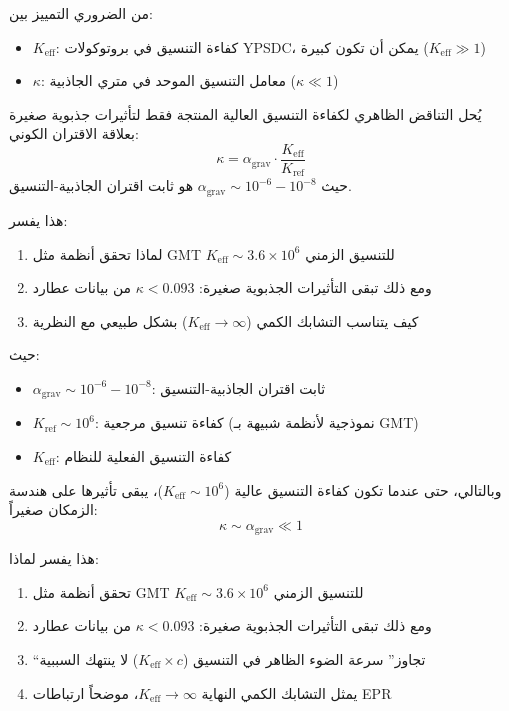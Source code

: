 \documentclass[11pt,a4paper]{article}
\begin{document}
	من الضروري التمييز بين:
	\begin{itemize}
		\item \textbf{$K_{\mathrm{eff}}$}: كفاءة التنسيق في بروتوكولات YPSDC، يمكن أن تكون كبيرة ($K_{\mathrm{eff}} \gg 1$)
		\item \textbf{$\kappa$}: معامل التنسيق الموحد في متري الجاذبية ($\kappa \ll 1$)
	\end{itemize}
	
	يُحل التناقض الظاهري لكفاءة التنسيق العالية المنتجة فقط لتأثيرات جذبوية صغيرة بعلاقة الاقتران الكوني:
	\begin{equation}
		\boxed{\kappa = \alpha_{\text{grav}} \cdot \frac{K_{\mathrm{eff}}}{K_{\text{ref}}}}
	\end{equation}
	حيث $\alpha_{\text{grav}} \sim 10^{-6} - 10^{-8}$ هو ثابت اقتران الجاذبية-التنسيق.
	
	هذا يفسر:
	\begin{enumerate}
		\item لماذا تحقق أنظمة مثل GMT $K_{\mathrm{eff}} \sim 3.6\times10^6$ للتنسيق الزمني
		\item ومع ذلك تبقى التأثيرات الجذبوية صغيرة: $\kappa < 0.093$ من بيانات عطارد
		\item كيف يتناسب التشابك الكمي ($K_{\mathrm{eff}} \to \infty$) بشكل طبيعي مع النظرية
	\end{enumerate}
	حيث:
	\begin{itemize}
		\item $\alpha_{\text{grav}} \sim 10^{-6} - 10^{-8}$: ثابت اقتران الجاذبية-التنسيق
		\item $K_{\text{ref}} \sim 10^6$: كفاءة تنسيق مرجعية (نموذجية لأنظمة شبيهة بـ GMT)
		\item $K_{\mathrm{eff}}$: كفاءة التنسيق الفعلية للنظام
	\end{itemize}
	
	وبالتالي، حتى عندما تكون كفاءة التنسيق عالية ($K_{\mathrm{eff}} \sim 10^6$)، يبقى تأثيرها على هندسة الزمكان صغيراً:
	\[
	\kappa \sim \alpha_{\text{grav}} \ll 1
	\]
	
	هذا يفسر لماذا:
	\begin{enumerate}
		\item تحقق أنظمة مثل GMT $K_{\mathrm{eff}} \sim 3.6\times10^6$ للتنسيق الزمني
		\item ومع ذلك تبقى التأثيرات الجذبوية صغيرة: $\kappa < 0.093$ من بيانات عطارد
		\item ``تجاوز'' سرعة الضوء الظاهر في التنسيق ($K_{\mathrm{eff}} \times c$) لا ينتهك السببية
		\item يمثل التشابك الكمي النهاية $K_{\mathrm{eff}} \to \infty$، موضحاً ارتباطات EPR
	\end{enumerate}
	
\end{document}
